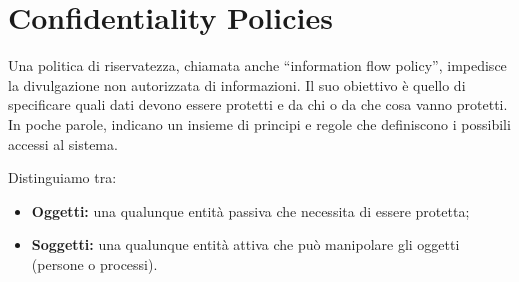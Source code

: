 \section{Confidentiality Policies}

Una politica di riservatezza, chiamata anche “information flow policy”,
impedisce la divulgazione
non autorizzata di informazioni. Il suo obiettivo è quello di specificare quali
dati devono essere
protetti e da chi o da che cosa vanno protetti. In poche parole, indicano un
insieme di principi e
regole che definiscono i possibili accessi al sistema.

Distinguiamo tra:

\begin{itemize}
    \item \textbf{Oggetti:} una qualunque entità passiva che necessita di
          essere protetta;
    \item \textbf{Soggetti:} una qualunque entità attiva che può manipolare
          gli oggetti (persone o processi).
\end{itemize}

